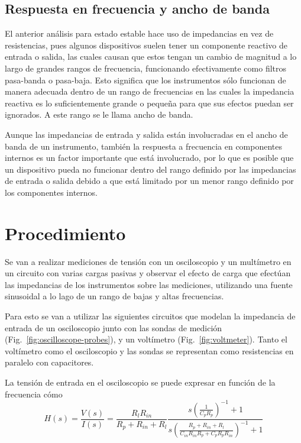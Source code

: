 \subsection{Respuesta en frecuencia y ancho de banda}
El anterior análisis para estado estable hace uso de impedancias
en vez  de resistencias, pues algunos dispositivos suelen tener
un componente reactivo de entrada o salida, las cuales causan que estos
tengan un cambio de magnitud a lo largo de grandes rangos de frecuencia, 
funcionando efectivamente como filtros pasa-banda o pasa-baja. Esto significa
que los instrumentos sólo funcionan de manera adecuada dentro de un rango
de frecuencias en las cuales la impedancia reactiva es lo suficientemente grande
o pequeña para que sus efectos puedan ser ignorados. A este rango se le llama ancho de banda.

Aunque las impedancias de entrada y salida están involucradas en el ancho de
banda de un instrumento, también la respuesta a frecuencia en componentes
internos es un factor importante que está involucrado, por lo que es posible que
un dispositivo pueda no funcionar dentro del rango definido por las impedancias
de entrada o salida debido a que está limitado por un menor rango definido por
los componentes internos.



\section{Procedimiento}
Se van a realizar mediciones de tensión con un osciloscopio y un multímetro en
un circuito con varias cargas pasivas y observar el efecto de carga que efectúan
las impedancias de los instrumentos sobre las mediciones, utilizando una fuente
sinusoidal a lo lago de un rango de bajas y altas frecuencias.

Para esto se van a utilizar las siguientes circuitos que modelan la impedancia
de entrada de un osciloscopio junto con las sondas de medición  (Fig.~\ref{fig:oscilloscope-probes}), y un voltímetro (Fig.~\ref{fig:voltmeter}).
Tanto el voltímetro como el osciloscopio y las sondas se representan como 
resistencias en paralelo con capacitores. 


La tensión de entrada en el osciloscopio se puede expresar en función de la 
frecuencia cómo
\[
    H(s) = \frac{V(s)}{I(s)} = \frac{R_l R_{in}}{R_p + R_{in} + R_l}
        \frac{s\left(\frac{1}{C_p R_p}\right)^{-1} + 1 }
            {s \left(\frac{R_p + R_{in} + R_l}{C_{in} R_{in} R_p + C_p R_p R_{in}}\right)^{-1} + 1}
\]

